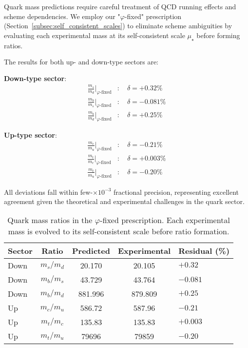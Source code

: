\documentclass[%
amsmath,amssymb,
aps,
prb,
floatfix,
twocolumn
]{revtex4-2}
\begin{document}
Quark mass predictions require careful treatment of QCD running effects and scheme dependencies. We employ our "$\varphi$-fixed" prescription (Section~\ref{subsec:self_consistent_scales}) to eliminate scheme ambiguities by evaluating each experimental mass at its self-consistent scale $\mu_\star$ before forming ratios.

The results for both up- and down-type sectors are:

\textbf{Down-type sector}:
\begin{align}
\frac{m_s}{m_d}\Big|_{\varphi\text{-fixed}} &: \quad \delta = +0.32\% \\
\frac{m_b}{m_s}\Big|_{\varphi\text{-fixed}} &: \quad \delta = -0.081\% \\
\frac{m_b}{m_d}\Big|_{\varphi\text{-fixed}} &: \quad \delta = +0.25\%
\end{align}

\textbf{Up-type sector}:
\begin{align}
\frac{m_c}{m_u}\Big|_{\varphi\text{-fixed}} &: \quad \delta = -0.21\% \\
\frac{m_t}{m_c}\Big|_{\varphi\text{-fixed}} &: \quad \delta = +0.003\% \\
\frac{m_t}{m_u}\Big|_{\varphi\text{-fixed}} &: \quad \delta = -0.20\%
\end{align}

All deviations fall within few-$\times 10^{-3}$ fractional precision, representing excellent agreement given the theoretical and experimental challenges in the quark sector.

\begin{table}[h]
\centering
\caption{Quark mass ratios in the $\varphi$-fixed prescription. Each experimental mass is evolved to its self-consistent scale before ratio formation.}
\label{tab:quarks}
\begin{tabular}{lcccl}
\hline\hline
Sector & Ratio & Predicted & Experimental & Residual (\%) \\
\hline
Down & $m_s/m_d$ & 20.170 & 20.105 & $+0.32$ \\
Down & $m_b/m_s$ & 43.729 & 43.764 & $-0.081$ \\
Down & $m_b/m_d$ & 881.996 & 879.809 & $+0.25$ \\
\hline
Up & $m_c/m_u$ & 586.72 & 587.96 & $-0.21$ \\
Up & $m_t/m_c$ & 135.83 & 135.83 & $+0.003$ \\
Up & $m_t/m_u$ & 79696 & 79859 & $-0.20$ \\
\hline\hline
\end{tabular}
\end{table}
\end{document}
